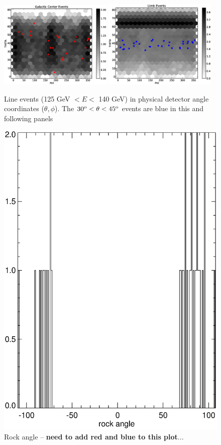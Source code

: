 \documentclass[aps,twocolumn,prd,superscriptaddress,showpacs,nofootinbib,fixfloat]{revtex4}
\newcommand{\degree}{^{\rm o}}
\begin{document}
\begin{figure}[p]
  \centering
  \includegraphics[width=0.48\textwidth]{plots/gc_theta_phi.eps}
  \includegraphics[width=0.48\textwidth]{plots/limb_theta_phi.eps}
  \caption{Line events (125 GeV $< E <$ 140 GeV) in physical detector angle
  coordinates ($\theta, \phi$).  The $30\degree < \theta < 45\degree$ events
  are blue in this and following panels}
  \label{fig:theta-phi}
\end{figure}

\begin{figure}[p]
  \centering
  \includegraphics[width=0.9\linewidth]{plots/rockangle.ps}
  \caption{Rock angle -- \textbf{need to add red and blue to this plot}...  }
  \label{fig:rock}
\end{figure}



\end{document}

